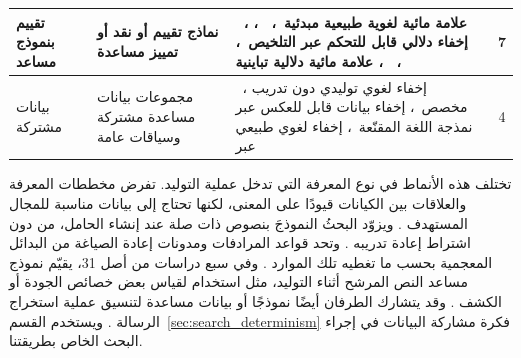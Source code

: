 \begin{table}[t]
\begin{RTL}
\begin{tabular}{|A{2cm}|A{2cm}|A{7cm}|C|}
    \hline
    تقييم بنموذج مساعد                             & نماذج تقييم أو نقد أو تمييز مساعدة                                  & ~\cite{li2023rewriting}، علامة مائية لغوية طبيعية مبدئية~\cite{ji2024principled}، ~\cite{xiang2023cpg}، إخفاء دلالي قابل للتحكم عبر التلخيص~\cite{zhang2024controllable}، ~\cite{yi2022alisa}، ~\cite{munyer2024deeptextmark}، علامة مائية دلالية تباينية~\cite{wang2025contrastive}                                                                                                                                                                                                                                                                                                                                                                                                                        & 7              \\
    \hline
    بيانات مشتركة                 & مجموعات بيانات مساعدة مشتركة وسياقات عامة                                      & ~\cite{kaptchuk2021meteor}، إخفاء لغوي توليدي دون تدريب مخصص~\cite{lin2024zero}، إخفاء بيانات قابل للعكس عبر نمذجة اللغة المقنّعة~\cite{zheng2022general}، إخفاء لغوي طبيعي عبر ~\cite{steinebach2024natural}                                                                                                                                                                                                                                                                                                                                                                                                                                                                                                                                & 4              \\
    \hline
  \end{tabular}
  \end{RTL}
\end{table}

تختلف هذه الأنماط في نوع المعرفة التي تدخل عملية التوليد. تفرض مخططات المعرفة والعلاقات بين الكيانات قيودًا على المعنى، لكنها تحتاج إلى بيانات مناسبة للمجال المستهدف \cite{li2024semantic,ding2023joint}. ويزوّد البحثُ النموذجَ بنصوص ذات صلة عند إنشاء الحامل، من دون اشتراط إعادة تدريبه \cite{wang2023hi,liao2024co}. وتحد قواعد المرادفات ومدونات إعادة الصياغة من البدائل المعجمية بحسب ما تغطيه تلك الموارد \cite{qiang2023natural}. وفي سبع دراسات من أصل 31، يقيّم نموذج مساعد النص المرشح أثناء التوليد، مثل استخدام  لقياس بعض خصائص الجودة أو الكشف \cite{xiang2023cpg,munyer2024deeptextmark}. وقد يتشارك الطرفان أيضًا نموذجًا أو بيانات مساعدة لتنسيق عملية استخراج الرسالة \cite{kaptchuk2021meteor,lin2024zero}. ويستخدم القسم~\ref{sec:search_determinism} فكرة مشاركة البيانات في إجراء البحث الخاص بطريقتنا.

